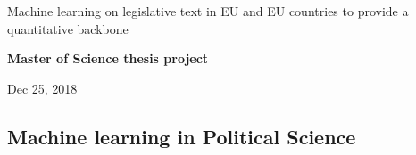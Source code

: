 \documentclass[%
oneside,                 %
final,                   %
10pt]{article}
\begin{document}

\newcommand{\exercisesection}[1]{\subsection*{#1}}






\thispagestyle{empty}

\begin{center}
{\LARGE\bf
\begin{spacing}{1.25}
Machine learning on legislative text in EU and EU countries to provide a quantitative backbone
\end{spacing}
}
\end{center}


\begin{center}
{\bf Master of Science thesis project${}^{}$} \\ [0mm]
\end{center}

\begin{center}
\end{center}
    

\begin{center}
Dec 25, 2018
\end{center}

\vspace{1cm}


\subsection*{Machine learning in Political Science}
\end{document}
